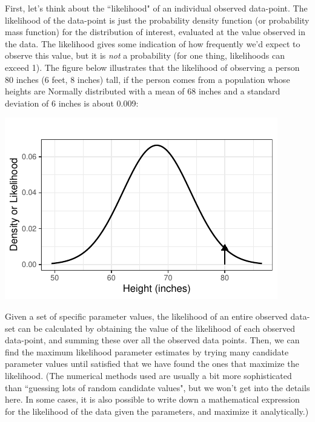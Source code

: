 \documentclass[twoside]{book}\usepackage[]{graphicx}\usepackage[]{xcolor}
\makeatletter
\def\maxwidth{ %
  \ifdim\Gin@nat@width>\linewidth
    \linewidth
  \else
    \Gin@nat@width
  \fi
}
\newenvironment{knitrout}{}{} %
\makeatother
\begin{document}
First, let's think about the ``likelihood" of an individual observed data-point.  The likelihood of the data-point is just the probability density function (or probability mass function) for the distribution of interest, evaluated at the value observed in the data. The likelihood gives some indication of how frequently we'd expect to observe this value, but it is \emph{not} a probability (for one thing, likelihoods can exceed 1).  The figure below illustrates that the likelihood of observing a person 80 inches (6 feet, 8 inches) tall, if the person comes from a population whose heights are Normally distributed with a mean of 68 inches and a standard deviation of 6 inches is about 0.009: 
\begin{knitrout}
\color{fgcolor}

{\centering \includegraphics[width=\maxwidth]{figures/fig-likelihood-1} 

}



\end{knitrout}


Given a set of specific parameter values, the likelihood of an entire observed data-set can be calculated by obtaining the value of the likelihood of each observed data-point, and summing these over all the observed data points.  Then, we can find the maximum likelihood parameter estimates by trying many candidate parameter values until satisfied that we have found the ones that maximize the likelihood. (The numerical methods used are usually a bit more sophisticated than ``guessing lots of random candidate values", but we won't get into the details here. In some cases, it is also possible to write down a mathematical expression for the likelihood of the data given the parameters, and maximize it analytically.)
\end{document}

